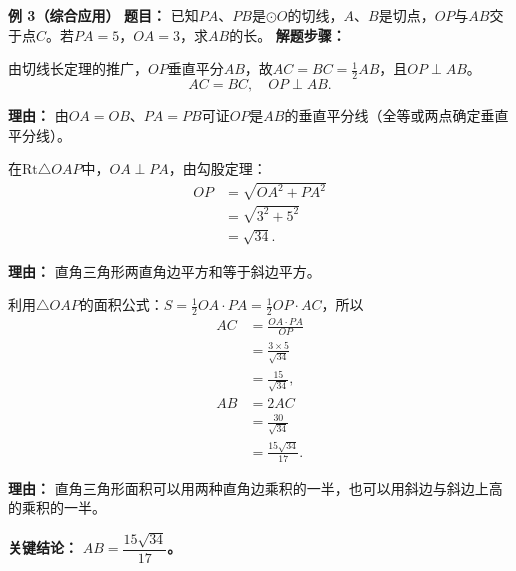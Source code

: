 \begin{examplebox}
	\medskip
	\textbf{\textcolor{CExample}{例 3（综合应用）}}
	\textbf{\textcolor{CExample}{题目：}}
	已知$PA$、$PB$是$\odot O$的切线，$A$、$B$是切点，$OP$与$AB$交于点$C$。若$PA=5$，$OA=3$，求$AB$的长。
	\textbf{\textcolor{CExample}{解题步骤：}}
	\begin{description}[style=nextline, leftmargin=2.8em, labelsep=0.5em, itemsep=0.45em]
		\item[\textbf{第一步（垂直平分）：}]
			由切线长定理的推广，$OP$垂直平分$AB$，故$AC=BC=\frac12 AB$，且$OP\perp AB$。
			\[
				AC = BC,\quad OP\perp AB.
			\]
			\par\textbf{理由：} 由$OA=OB$、$PA=PB$可证$OP$是$AB$的垂直平分线（全等或两点确定垂直平分线）。
		\item[\textbf{第二步（求OP）：}]
			在$\mathrm{Rt}\triangle OAP$中，$OA\perp PA$，由勾股定理：
			\[
				\begin{aligned}
					OP &= \sqrt{OA^2 + PA^2} \\ &= \sqrt{3^2 + 5^2} \\ &= \sqrt{34}.
			\end{aligned}
			\]
			\par\textbf{理由：} 直角三角形两直角边平方和等于斜边平方。
		\item[\textbf{第三步（面积法求AB）：}]
			利用$\triangle OAP$的面积公式：$S = \frac12 OA\cdot PA = \frac12 OP\cdot AC$，所以
			\[
				\begin{aligned}
					AC &= \frac{OA\cdot PA}{OP} \\ &= \frac{3\times5}{\sqrt{34}} \\ &= \frac{15}{\sqrt{34}},\\ AB &= 2AC \\ &= \frac{30}{\sqrt{34}} \\ &= \frac{15\sqrt{34}}{17}.
			\end{aligned}
			\]
			\par\textbf{理由：} 直角三角形面积可以用两种直角边乘积的一半，也可以用斜边与斜边上高的乘积的一半。
	\end{description}
	\textbf{\textcolor{CExample}{关键结论：}}
	\textbf{$AB = \dfrac{15\sqrt{34}}{17}$。}
\end{examplebox}
